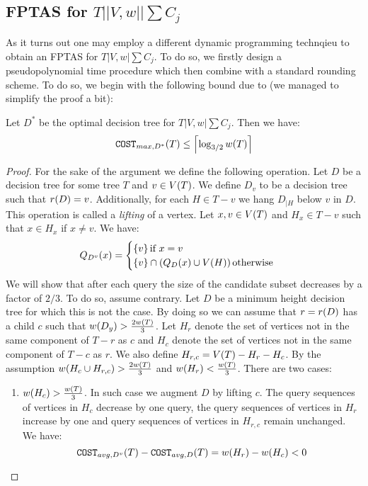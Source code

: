 \subsection{FPTAS for $T||V,w||\sum C_j$}
As it turns out one may employ a different dynamic programming technqieu to obtain an FPTAS for $T|V,w|\sum C_j$. To do so, we firstly design a pseudopolynomial time procedure which then combine with a standard rounding scheme. To do so, we begin with the following bound due to \cite{Fast_app_centroid_trees} (we managed to simplify the proof a bit):
\begin{theorem}
    Let $D^*$ be the optimal decision tree for $T|V,w|\sum C_j$. Then we have:
    $$\texttt{COST}_{max, D^*}\mathopen{}\left( T \right)\leq \mathopen{}\left\lceil \log_{3/2}w\mathopen{}\left( T \right) \right\rceil$$
    \begin{proof}
        For the sake of the argument we define the following operation. Let $D$ be a decision tree for some tree $T$ and $v\in V\mathopen{}\left( T \right)$. We define $D_v$ to be a decision tree such that $r\mathopen{}\left( D \right)=v$. Additionally, for each $H\in T-v$ we hang $D_{|H}$ below $v$ in $D$. This operation is called a \textit{lifting} of a vertex. Let $x,v\in V\mathopen{}\left( T \right)$ and $H_x\in T-v$ such that $x\in H_x$ if $x\neq v$. We have:
        $$
        Q_{D^v}\mathopen{}\left( x \right)=\begin{cases}
            \mathopen{}\left\{ v \right\} \text{if } x=v\\
            \mathopen{}\left\{ v \right\}\cap \mathopen{}\left( Q_{D}\mathopen{}\left( x \right)\cup V\mathopen{}\left( H \right) \right) \text{otherwise }
        \end{cases}
        $$
        We will show that after each query the size of the candidate subset decreases by a factor of $2/3$. To do so, assume contrary. Let $D$ be a minimum height decision tree for which this is not the case. By doing so we can assume that $r=r\mathopen{}\left( D \right)$ has a child $c$ such that $w\mathopen{}\left( D_y \right)> \frac{2w\mathopen{}\left( T \right)}{3}$. Let $H_r$ denote the set of vertices not in the same component of $T-r$ as $c$ and $H_c$ denote the set of vertices not in the same component of $T-c$ as $r$. We also define $H_{r, c}=V\mathopen{}\left( T \right)-H_r-H_c$. By the assumption $w\mathopen{}\left( H_c\cup H_{r, c} \right)>\frac{2w\mathopen{}\left( T \right)}{3}$ and $w\mathopen{}\left( H_r \right)<\frac{w\mathopen{}\left( T \right)}{3}$. There are two cases:
        \begin{enumerate}
            \item $w\mathopen{}\left( H_c \right)>\frac{w\mathopen{}\left( T \right)}{3}$. In such case we augment $D$ by lifting $c$. The query sequences of vertices in $H_c$ decrease by one query, the
query sequences of vertices in $H_r$ increase by one and query sequences of vertices in $H_{r,c}$ remain unchanged. We have:
$$
\texttt{COST}_{avg, D^v}\mathopen{}\left( T \right)-\texttt{COST}_{avg, D}\mathopen{}\left( T \right)=w\mathopen{}\left( H_r \right)-w\mathopen{}\left( H_c \right)< 0
$$
\end{enumerate}
\end{proof}
\end{theorem}
